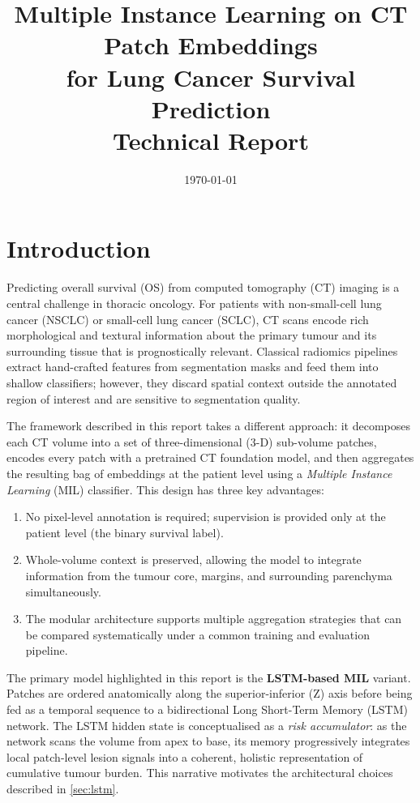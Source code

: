 \documentclass[11pt,a4paper]{article}
\title{%
  \Large \textbf{Multiple Instance Learning on CT Patch Embeddings\\
  for Lung Cancer Survival Prediction}\\[0.5em]
  \large Technical Report
}
\author{}
\date{\today}
\begin{document}
\maketitle
\tableofcontents
\newpage

\section{Introduction}

Predicting overall survival (OS) from computed tomography (CT) imaging is a central
challenge in thoracic oncology. For patients with non-small-cell lung cancer (NSCLC)
or small-cell lung cancer (SCLC), CT scans encode rich morphological and textural
information about the primary tumour and its surrounding tissue that is prognostically
relevant. Classical radiomics pipelines extract hand-crafted features from
segmentation masks and feed them into shallow classifiers; however, they discard spatial
context outside the annotated region of interest and are sensitive to segmentation
quality.

The framework described in this report takes a different approach: it decomposes
each CT volume into a set of three-dimensional (3-D) sub-volume patches, encodes
every patch with a pretrained CT foundation model, and then aggregates the resulting
bag of embeddings at the patient level using a \emph{Multiple Instance Learning}
(MIL) classifier. This design has three key advantages:
\begin{enumerate}
  \item No pixel-level annotation is required; supervision is provided only at the
        patient level (the binary survival label).
  \item Whole-volume context is preserved, allowing the model to integrate information
        from the tumour core, margins, and surrounding parenchyma simultaneously.
  \item The modular architecture supports multiple aggregation strategies that can be
        compared systematically under a common training and evaluation pipeline.
\end{enumerate}

The primary model highlighted in this report is the \textbf{LSTM-based MIL} variant.
Patches are ordered anatomically along the superior-inferior (Z) axis before being
fed as a temporal sequence to a bidirectional Long Short-Term Memory (LSTM) network.
The LSTM hidden state is conceptualised as a \emph{risk accumulator}: as the network
scans the volume from apex to base, its memory progressively integrates local patch-level
lesion signals into a coherent, holistic representation of cumulative tumour burden.
This narrative motivates the architectural choices described in
\cref{sec:lstm}.
\end{document}
